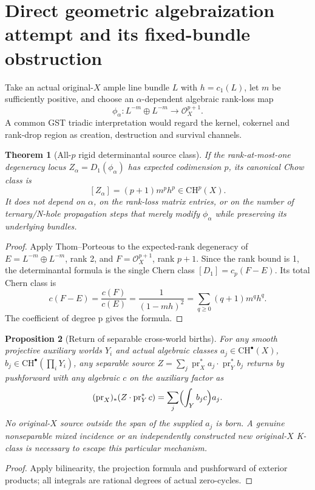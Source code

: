 \documentclass[11pt]{article}
\newtheorem{theorem}{Theorem}[section]
\newtheorem{proposition}[theorem]{Proposition}
\newcommand{\CH}{\mathrm{CH}}
\begin{document}
\section{Direct geometric algebraization attempt and its fixed-bundle obstruction}

Take an actual original-\(X\) ample line bundle \(L\) with
\(h=c_1(L)\), let \(m\) be sufficiently positive, and choose an
\(\alpha\)-dependent algebraic rank-loss map
\[
\phi_\alpha:L^{-m}\oplus L^{-m}\longrightarrow
\mathcal O_X^{p+1}.
\]
A common GST triadic interpretation would regard the kernel,
cokernel and rank-drop region as creation, destruction and
survival channels.

\begin{theorem}[All-\(p\) rigid determinantal source class]
If the rank-at-most-one degeneracy locus
\(Z_\alpha=D_1(\phi_\alpha)\) has expected codimension \(p\),
its canonical Chow class is
\[
\boxed{[Z_\alpha]=(p+1)m^p h^p\in\CH^p(X).}
\]
It does not depend on \(\alpha\), on the rank-loss matrix entries,
or on the number of ternary/N-hole propagation steps that merely
modify \(\phi_\alpha\) while preserving its underlying bundles.
\end{theorem}
\begin{proof}
Apply Thom--Porteous to the expected-rank degeneracy
of \(E=L^{-m}\oplus L^{-m}\), rank 2, and
\(F=\mathcal O_X^{p+1}\), rank \(p+1\). Since the rank bound
is 1, the determinantal formula is the single Chern class
\([D_1]=c_p(F-E)\). Its total Chern class is
\[
c(F-E)=\frac{c(F)}{c(E)}
=\frac{1}{(1-mh)^2}
=\sum_{q\ge0}(q+1)m^qh^q.
\]
The coefficient of degree p gives the formula.
\end{proof}

\begin{proposition}[Return of separable cross-world births]
For any smooth projective auxiliary worlds \(Y_i\) and actual
algebraic classes \(a_j\in\CH^\bullet(X)\), \(b_j\in
\CH^\bullet(\prod_iY_i)\), any separable source
\(Z=\sum_j\operatorname{pr}_X^*a_j\cdot
\operatorname{pr}_Y^*b_j\) returns by pushforward with any
algebraic \(c\) on the auxiliary factor as
\[
(\operatorname{pr}_X)_*(Z\cdot\operatorname{pr}_Y^*c)
=\sum_j\Bigl(\int_Y b_jc\Bigr)a_j.
\]
No original-\(X\) source outside the span of the supplied \(a_j\)
is born. A genuine nonseparable mixed incidence or an
independently constructed new original-\(X\) K-class is necessary
to escape this \emph{particular} mechanism.
\end{proposition}
\begin{proof}
Apply bilinearity, the projection formula and pushforward
of exterior products; all integrals are rational degrees of
actual zero-cycles.
\end{proof}
\end{document}
